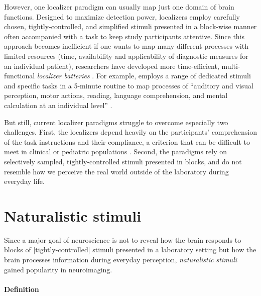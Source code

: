 However, one localizer paradigm can usually map just one domain of brain
functions.
Designed to maximize detection power, localizers employ carefully chosen,
tightly-controlled, and simplified stimuli presented in a block-wise manner
often accompanied with a task to keep study participants attentive.
Since this approach becomes inefficient if one wants to map many different
processes with limited resources (time, availability and applicability of
diagnostic measures for an individual patient), researchers have developed more
time-efficient, multi-functional \textit{localizer batteries}
\citep{barch2013function, drobyshevsky2006rapid, pinho2018individual,
pinho2020individual, pinel2007fast}.
For example, \citet{pinel2007fast} employs a range of dedicated stimuli and
specific tasks in a 5-minute routine to map processes of ``auditory and visual
perception, motor actions, reading, language comprehension, and mental
calculation at an individual level'' \citep{pinel2007fast}.

But still, current localizer paradigms struggle to overcome especially two
challenges.
%
First, the localizers depend heavily on the participants' comprehension of the
task instructions and their compliance, a criterion that can be difficult to
meet in clinical or pediatric populations \citep{eickhoff2020towards,
vanderwal2015inscapes, vanderwal2019movies}.
Second, the paradigms rely on selectively sampled, tightly-controlled stimuli
presented in blocks, and do not resemble how we perceive the real world outside
of the laboratory during everyday life.


\section{Naturalistic stimuli}
%
Since a major goal of neuroscience is not to reveal how the brain
responds to blocks of [tightly-controlled] stimuli presented in a laboratory
setting but how the brain processes information during everyday perception,
\textit{naturalistic stimuli} gained popularity in neuroimaging.


\paragraph{Definition}

